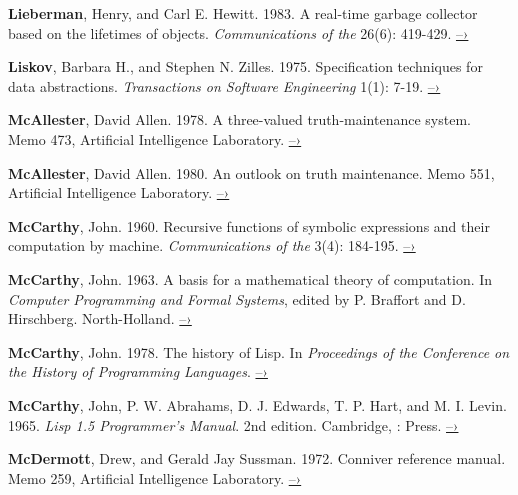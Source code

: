  \label{Lieberman and Hewitt 1983}
\textbf{Lieberman}, Henry, and Carl E. Hewitt. 1983. A real-time garbage collector based
on the lifetimes of objects. \textit{Communications of the }
26(6): 419-429.
\href{http://dspace.mit.edu/handle/1721.1/6335}{–›}

 \label{Liskov and Zilles (1975)}
\textbf{Liskov}, Barbara H., and Stephen N. Zilles.  1975.  Specification techniques for
data abstractions.  \textit{ Transactions on Software Engineering}
1(1): 7-19.
\href{http://csg.csail.mit.edu/CSGArchives/memos/Memo-117.pdf}{–›}

 \label{McAllester (1978; 1980)}
\textbf{McAllester}, David Allen.  1978.  A three-valued truth-maintenance system.  Memo
473,  Artificial Intelligence Laboratory.
\href{http://dspace.mit.edu/handle/1721.1/6296}{–›}

\textbf{McAllester}, David Allen.  1980.  An outlook on truth maintenance.  Memo 551,
 Artificial Intelligence Laboratory.
\href{http://dspace.mit.edu/handle/1721.1/6327}{–›}

 \label{McCarthy 1960}
\textbf{McCarthy}, John.  1960.  Recursive functions of symbolic expressions and their
computation by machine.  \textit{Communications of the }
3(4): 184-195.
\href{http://www-formal.stanford.edu/jmc/recursive.pdf}{–›}

 \label{McCarthy 1963}
\textbf{McCarthy}, John.  1963.  A basis for a mathematical theory of computation.  In
\textit{Computer Programming and Formal Systems}, edited by P. Braffort and
D. Hirschberg.  North-Holland.
\href{http://www-formal.stanford.edu/jmc/basis.html}{–›}

 \label{McCarthy 1978}
\textbf{McCarthy}, John.  1978.  The history of Lisp.  In \textit{Proceedings of the
  Conference on the History of Programming
Languages}.
\href{http://www-formal.stanford.edu/jmc/history/lisp/lisp.html}{–›}

 \label{McCarthy et al. 1965}
\textbf{McCarthy}, John, P. W. Abrahams, D. J. Edwards, T. P. Hart, and M. I.  Levin.
1965.  \textit{Lisp 1.5 Programmer's Manual}.  2nd edition.  Cambridge, :
 Press.
\href{http://www.softwarepreservation.org/projects/LISP/book/LISP\%201.5\%20Programmers\%20Manual.pdf/view}{–›}

 \label{McDermott and Sussman (1972)}
\textbf{McDermott}, Drew, and Gerald Jay Sussman.  1972. Conniver reference manual.
Memo 259,  Artificial Intelligence Laboratory.
\href{http://dspace.mit.edu/handle/1721.1/6203}{–›}

